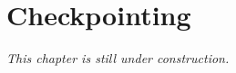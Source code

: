 \chapter{Checkpointing}
\label{ch:checkpointing}

\textit{This chapter is still under construction.}
